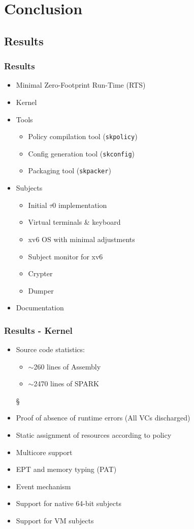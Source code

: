 \documentclass[xcolor={dvipsnames}]{beamer}
\begin{document}
\section{Conclusion}
\subsection{Results}
\begin{frame}\frametitle{Results}
\begin{itemize}
	\item Minimal Zero-Footprint Run-Time (RTS)
	\item Kernel
	\item Tools
	\begin{itemize}
		\item Policy compilation tool (\texttt{skpolicy})
		\item Config generation tool (\texttt{skconfig})
		\item Packaging tool (\texttt{skpacker})
	\end{itemize}
	\item Subjects
	\begin{itemize}
		\item Initial $\tau$0 implementation
		\item Virtual terminals \& keyboard
		\item xv6 OS with minimal adjustments
		\item Subject monitor for xv6
		\item Crypter
		\item Dumper
	\end{itemize}
	\item Documentation
\end{itemize}
\end{frame}

\begin{frame}\frametitle{Results - Kernel}
\begin{itemize}
	\item Source code statistics:
	\begin{itemize}
		\item $\sim$260 lines of Assembly
		\item $\sim$2470 lines of SPARK
	\end{itemize}§
	\item Proof of absence of runtime errors (All VCs discharged)
	\item Static assignment of resources according to policy
	\item Multicore support
	\item EPT and memory typing (PAT)
	\item Event mechanism
	\item Support for native 64-bit subjects
	\item Support for VM subjects
\end{itemize}
\end{frame}
\end{document}
